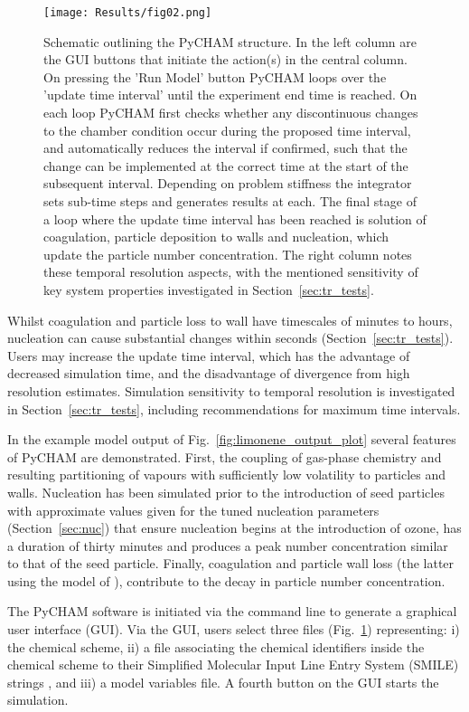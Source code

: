 \documentclass[gmd, manuscript]{copernicus}
\begin{document}
\begin{figure}[t]
\texttt{[image: Results/fig02.png]}
\caption{Schematic outlining the PyCHAM structure.  In the left column are the GUI buttons that initiate the action(s) in the central column.  On pressing the 'Run Model' button PyCHAM loops over the 'update time interval' until the experiment end time is reached.  On each loop PyCHAM first checks whether any discontinuous changes to the chamber condition occur during the proposed time interval, and automatically reduces the interval if confirmed, such that the change can be implemented at the correct time at the start of the subsequent interval.  Depending on problem stiffness the integrator sets sub-time steps and generates results at each.  The final stage of a loop where the update time interval has been reached is solution of coagulation, particle deposition to walls and nucleation, which update the particle number concentration.  The right column notes these temporal resolution aspects, with the mentioned sensitivity of key system properties investigated in Section~\ref{sec:tr_tests}.}
\label{fig:schematic}
\end{figure}

Whilst coagulation and particle loss to wall have timescales of minutes to hours, nucleation can cause substantial changes within seconds (Section~\ref{sec:tr_tests}).  Users may increase the update time interval, which has the advantage of decreased simulation time, and the disadvantage of divergence from high resolution estimates.  Simulation sensitivity to temporal resolution is investigated in Section~\ref{sec:tr_tests}, including recommendations for maximum time intervals. 

In the example model output of Fig.~\ref{fig:limonene_output_plot} several features of PyCHAM are demonstrated.  First, the coupling of gas-phase chemistry and resulting partitioning of vapours with sufficiently low volatility to particles and walls.  Nucleation has been simulated prior to the introduction of seed particles with approximate values given for the tuned nucleation parameters (Section~\ref{sec:nuc}) that ensure nucleation begins at the introduction of ozone, has a duration of thirty minutes and produces a peak number concentration similar to that of the seed particle.  Finally, coagulation and particle wall loss (the latter using the model of \citet{McMurry1985}), contribute to the decay in particle number concentration.

The PyCHAM software is initiated via the command line to generate a graphical user interface (GUI).  Via the GUI, users select three files (Fig.~\ref{fig:schematic}) representing: i) the chemical scheme, ii) a file associating the chemical identifiers inside the chemical scheme to their Simplified Molecular Input Line Entry System (SMILE) strings \citep{Weininger1988}, and iii) a model variables file.  A fourth button on the GUI starts the simulation.
\end{document}

